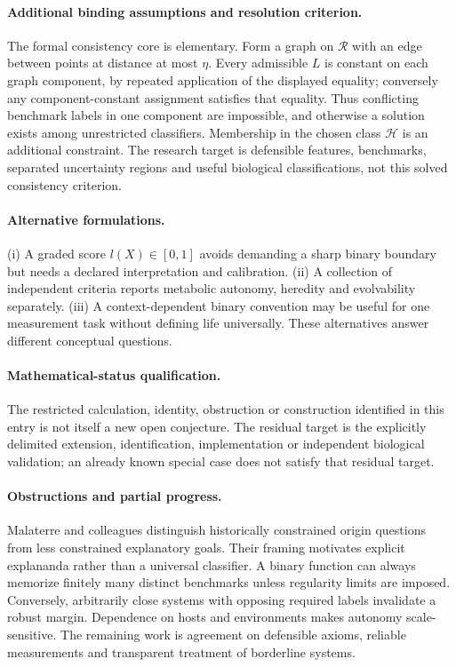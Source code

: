 \documentclass[11pt]{article}
\begin{document}
\paragraph{Additional binding assumptions and resolution criterion.} The formal consistency core is elementary. Form a graph on $\mathcal R$ with an edge between points at distance at most $\eta$. Every admissible $L$ is constant on each graph component, by repeated application of the displayed equality; conversely any component-constant assignment satisfies that equality. Thus conflicting benchmark labels in one component are impossible, and otherwise a solution exists among unrestricted classifiers. Membership in the chosen class $\mathcal H$ is an additional constraint. The research target is defensible features, benchmarks, separated uncertainty regions and useful biological classifications, not this solved consistency criterion.

\paragraph{Alternative formulations.} (i) A graded score $l(X)\in[0,1]$ avoids demanding a sharp binary boundary but needs a declared interpretation and calibration. (ii) A collection of independent criteria reports metabolic autonomy, heredity and evolvability separately. (iii) A context-dependent binary convention may be useful for one measurement task without defining life universally. These alternatives answer different conceptual questions.

\paragraph{Mathematical-status qualification.} The restricted calculation, identity, obstruction or construction identified in this entry is not itself a new open conjecture. The residual target is the explicitly delimited extension, identification, implementation or independent biological validation; an already known special case does not satisfy that residual target.

\paragraph{Obstructions and partial progress.} Malaterre and colleagues distinguish historically constrained origin questions from less constrained explanatory goals. Their framing motivates explicit explananda rather than a universal classifier. A binary function can always memorize finitely many distinct benchmarks unless regularity limits are imposed. Conversely, arbitrarily close systems with opposing required labels invalidate a robust margin. Dependence on hosts and environments makes autonomy scale-sensitive. The remaining work is agreement on defensible axioms, reliable measurements and transparent treatment of borderline systems.
\end{document}

